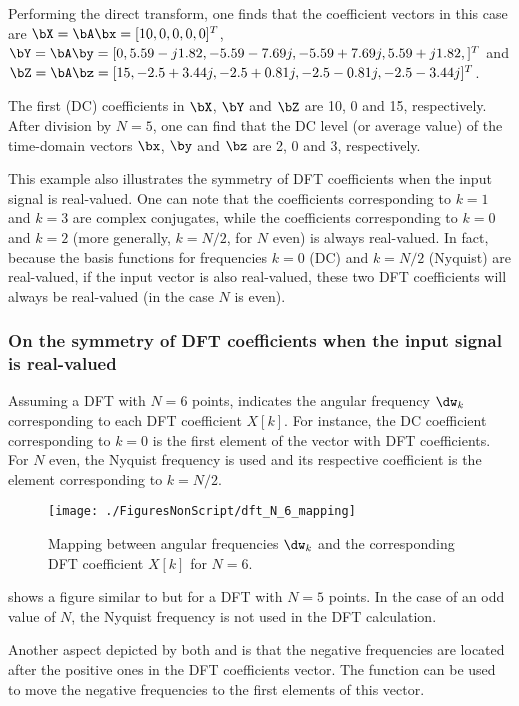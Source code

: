 Performing the direct transform, one finds that the coefficient vectors in this case are $\bX = \bA \bx = [10, 0, 0, 0, 0]^T$, $\bY = \bA \by = [0, 5.59-j1.82, -5.59-7.69j, -5.59+7.69j, 5.59+j1.82,]^T$ and $\bZ = \bA \bz = [15, -2.5+3.44j, -2.5+0.81j,  -2.5-0.81j, -2.5-3.44j]^T$.

The first (DC) coefficients in $\bX$, $\bY$ and $\bZ$ are 10, 0 and 15, respectively. After division by $N=5$, one can find that the DC level (or average value) of the time-domain vectors $\bx$, $\by$ and $\bz$ are 2, 0 and 3, respectively. 

This example also illustrates the symmetry of DFT coefficients when the input signal is real-valued. One can note that the coefficients corresponding to $k=1$ and $k=3$ are complex conjugates, while the coefficients corresponding to $k=0$ and $k=2$ (more generally, $k=N/2$, for $N$ even) is always real-valued.
In fact, because the basis functions for frequencies $k=0$ (DC) and $k=N/2$ (Nyquist) are real-valued, if the input
vector is also real-valued, these two DFT coefficients will always be real-valued (in the case $N$ is even).
\eExample 

\subsubsection{On the symmetry of DFT coefficients when the input signal is real-valued}
\label{sec:dft_symmetry}

Assuming a DFT with $N=6$ points,  indicates the angular frequency $\dw_k$ corresponding to each DFT coefficient $X[k]$. For instance, the DC coefficient corresponding to $k=0$ is the first element of the vector with
DFT coefficients. For $N$ even, the Nyquist frequency is used and its respective coefficient is the element corresponding to
$k=N/2$.

\begin{figure}[htbp]
\centering
\texttt{[image: ./FiguresNonScript/dft\_N\_6\_mapping]}
\caption{Mapping between angular frequencies $\dw_k$ and the corresponding DFT coefficient $X[k]$ for $N=6$.\label{fig:dft_N_6_mapping}}
\end{figure}

 shows a figure similar to  but for a DFT with $N=5$ points. In the case of an odd value of $N$, the Nyquist frequency is not used in the DFT calculation.


Another aspect depicted by both  and  is that the negative frequencies are located after the positive ones in the DFT coefficients
vector. The {\matlab} function  can be used to move the negative frequencies to the first elements of this vector.

